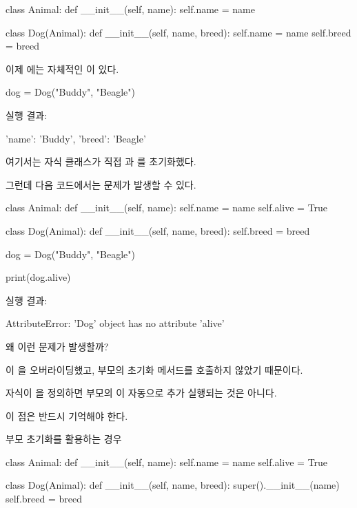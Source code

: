 \begin{dhkcode}
class Animal:
    def __init__(self, name):
        self.name = name

class Dog(Animal):
    def __init__(self, name, breed):
        self.name = name
        self.breed = breed
\end{dhkcode}

이제 에는 자체적인 이 있다.

\begin{dhkcode}
dog = Dog("Buddy", "Beagle")
\end{dhkcode}

실행 결과:

\begin{dhkzsh}
{'name': 'Buddy', 'breed': 'Beagle'}
\end{dhkzsh}

여기서는 자식 클래스가 직접 과 를 초기화했다.

그런데 다음 코드에서는 문제가 발생할 수 있다.

\begin{dhkcode}
class Animal:
    def __init__(self, name):
        self.name = name
        self.alive = True


class Dog(Animal):
    def __init__(self, name, breed):
        self.breed = breed

dog = Dog("Buddy", "Beagle")

print(dog.alive)
\end{dhkcode}

실행 결과:

\begin{dhkzsh}
AttributeError: 'Dog' object has no attribute 'alive'
\end{dhkzsh}

왜 이런 문제가 발생할까?

이 을 오버라이딩했고, 부모의 초기화 메서드를 호출하지 않았기 때문이다.

자식이 을 정의하면 부모의 이 자동으로 추가 실행되는 것은 아니다.

이 점은 반드시 기억해야 한다.

\begin{dhknote}
\begin{dhksmry}[centered]
부모 초기화를 활용하는 경우
\end{dhksmry}
\end{dhknote}

\begin{dhkcode}
class Animal:
    def __init__(self, name):
        self.name = name
        self.alive = True


class Dog(Animal):
    def __init__(self, name, breed):
        super().__init__(name)
        self.breed = breed
\end{dhkcode}


